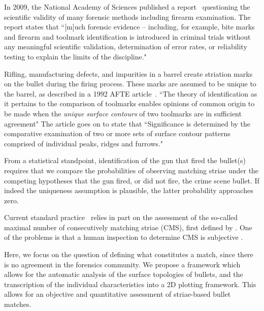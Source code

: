 \documentclass[aoas, preprint]{imsart}\usepackage[]{graphicx}\usepackage[]{color}
\newcommand{\hh}[1]{{\color{magenta} #1}}
\begin{document}
In 2009, the National Academy of Sciences published a report~\citep{NAS:2009} questioning the scientific validity of many forensic methods including firearm examination. The report states that ``[m]uch forensic evidence -- including, for example, bite marks and firearm and toolmark identification is introduced in criminal trials without any meaningful scientific validation, determination of error rates, or reliability testing to explain the limits of the discipline."

Rifling, manufacturing defects, and impurities in a barrel create striation marks on the bullet during the firing process. These marks are assumed to be unique to the barrel, as described in a 1992 AFTE article~\citep{afte:1992}. ``The theory of identification as it pertains to the comparison of toolmarks enables opinions of common origin to be made when the \emph{unique surface contours} of two toolmarks are in sufficient agreement" The article goes on to state that ``Significance is determined by the comparative examination of two or more sets of surface contour patterns comprised of individual peaks, ridges and furrows."

From a statistical standpoint, identification of the gun that fired the bullet(s) requires that we compare the probabilities of observing matching striae under the competing hypotheses that the gun fired, or did not fire, the crime scene bullet. If indeed the uniqueness assumption is plausible, the latter probability approaches zero.

Current standard practice~\cite{afte:1992} relies in part on the assessment of the so-called maximal number of consecutively matching striae (CMS), first defined by \citet{biasotti:1959}.
One of the problems is that a human inspection to determine CMS is subjective \citep{miller:1998}.

Here, we focus on the question of defining what constitutes a match, since there is no agreement in the forensics community. We propose a framework which allows for the automatic analysis of the surface topologies of bullets, and the transcription of the individual characteristics into a 2D plotting framework. 
This allows for an objective and quantitative assessment of striae-based bullet matches.

\end{document}

